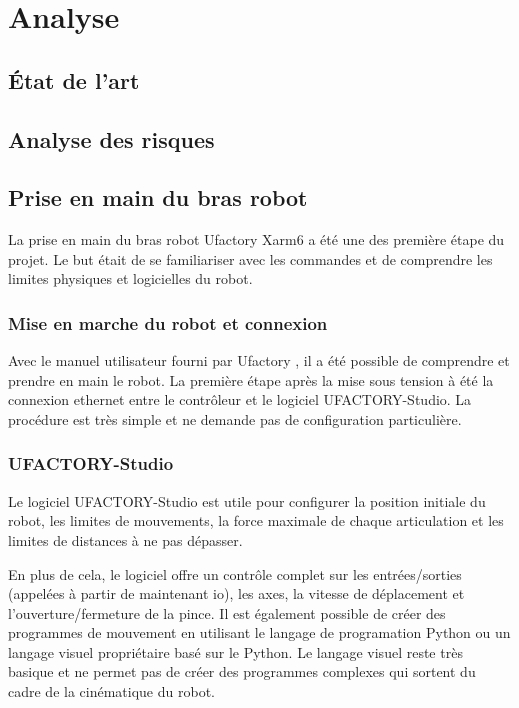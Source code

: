 \chapter{Analyse}



\section{État de l'art}

\section{Analyse des risques}

\section{Prise en main du bras robot}
La prise en main du bras robot Ufactory Xarm6 a été une des première étape du projet. Le but était de se familiariser avec les commandes et de comprendre les limites physiques et logicielles du robot.

\subsection{Mise en marche du robot et connexion}
Avec le manuel utilisateur fourni par Ufactory \cite{UserManual}, il a été possible de comprendre et prendre en main le robot. La première étape après la mise sous tension à été la connexion ethernet entre le contrôleur et le logiciel UFACTORY-Studio. La procédure est très simple et ne demande pas de configuration particulière.

\subsection{UFACTORY-Studio}
Le logiciel UFACTORY-Studio est utile pour configurer la position initiale du robot, les limites de mouvements, la force maximale de chaque articulation et les limites de distances à ne pas dépasser.

En plus de cela, le logiciel offre un contrôle complet sur les entrées/sorties (appelées à partir de maintenant \gls{io}), les axes, la vitesse de déplacement et l'ouverture/fermeture de la pince. Il est également possible de créer des programmes de mouvement en utilisant le langage  de programation Python ou un langage visuel propriétaire basé sur le Python. Le langage visuel reste très basique et ne permet pas de créer des programmes complexes qui sortent du cadre de la cinématique du robot.

